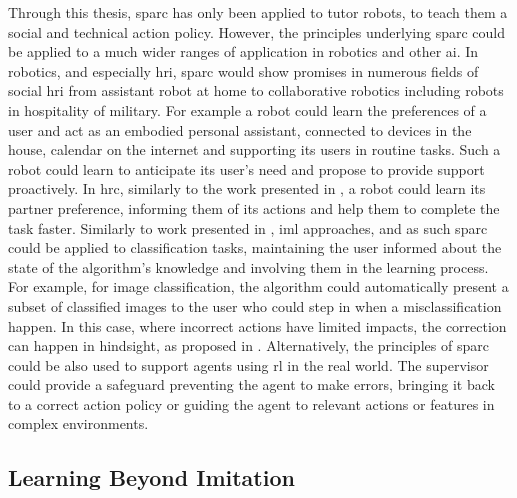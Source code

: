 Through this thesis, \gls{sparc} has only been applied to tutor robots, to teach them a social and technical action policy. However, the principles underlying \gls{sparc} could be applied to a much wider ranges of application in robotics and other \gls{ai}. In robotics, and especially \gls{hri}, \gls{sparc} would show promises in numerous fields of social \gls{hri} from assistant robot at home to collaborative robotics including robots in hospitality of military. For example a robot could learn the preferences of a user and act as an embodied personal assistant, connected to  devices in the house, calendar on the internet and supporting its users in routine tasks. Such a robot could learn to anticipate its user's need and propose to provide support proactively. In \gls{hrc}, similarly to the work presented in \cite{munzer2017efficient}, a robot could learn its partner preference, informing them of its actions and help them to complete the task faster. Similarly to work presented in \cite{feil2005defining}, \gls{iml} approaches, and as such \gls{sparc} could be applied to classification tasks, maintaining the user informed about the state of the algorithm's knowledge and involving them in the learning process. For example, for image classification, the algorithm could automatically present a subset of classified images to the user who could step in when a misclassification happen. In this case, where incorrect actions have limited impacts, the correction can happen in hindsight, as proposed in \cite{chernova2009interactive}. Alternatively, the principles of \gls{sparc} could be also used to support agents using \gls{rl} in the real world. The supervisor could provide a safeguard preventing the agent to make errors, bringing it back to a correct action policy or guiding the agent to relevant actions or features in complex environments.


\subsection{Learning Beyond Imitation}

